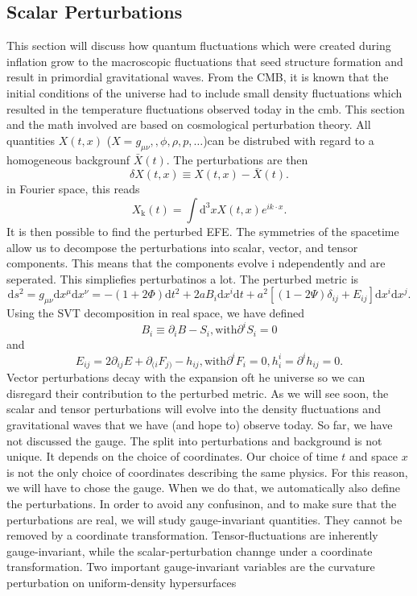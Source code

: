 \documentclass[12pt]{article}
\begin{document}
\subsection{Scalar Perturbations}
This section will discuss how quantum fluctuations which were created during inflation grow to the macroscopic fluctuations that seed structure formation and result in primordial gravitational waves. From the CMB, it is known that the initial conditions of the universe had to include small density fluctuations which resulted in the temperature fluctuations observed today in the cmb. This section and the math involved are based on cosmological perturbation theory. All quantities $X(t,x)$ ($X = g_{\mu\nu},, \phi, \rho, p, \dots$)can be distrubed with regard to a homogeneous backgrounf $\bar{X}(t)$. The perturbations are then
\begin{equation}
    \delta X(t,x) \equiv X(t,x) - \bar{X}(t).
\end{equation}
in Fourier space, this reads
\begin{equation}
    X_{\mathrm{k}}(t) = \int \mathrm{d}^3x X(t,x) e^{i k \cdot x}.
\end{equation}
It is then possible to find the perturbed EFE. The symmetries of the spacetime allow us to decompose the perturbations into scalar, vector, and tensor components. This means that the components evolve i ndependently and are seperated. This simpliefies perturbatinos a lot. The perturbed metric is 
\begin{equation}
    \mathrm{d}s^2 = g_{\mu\nu} \mathrm{d}x^\mu \mathrm{d}x^\nu = -(1+2 \Phi)\mathrm{d}t^2 + 2a B_i \mathrm{d}x^i \mathrm{d}t + a^2 \left[(1-2\Psi)\delta_{ij} + E_{ij}\right] \mathrm{d}x^i\mathrm{d}x^j.
\end{equation}
Using the SVT decomposition in real space, we have defined
\begin{equation}
    B_i \equiv \partial_i B- S_i, \mathrm{ with } \partial^i S_i = 0
\end{equation}
and
\begin{equation}
E_{ij} = 2 \partial_{ij}E + \partial_{(i}F_{j)} - h_{ij}, \mathrm{ with } \partial^iF_i = 0, h^i_i = \partial^ih_{ij} = 0.    
\end{equation}
Vector perturbations decay with the expansion oft 
he universe so we can disregard their contribution to the perturbed metric. As we will see soon, the scalar and tensor perturbations will evolve into the density fluctuations and gravitational waves that we have (and hope to) observe today. So far, we have not discussed the gauge. The split into perturbations and background is not unique. It depends on the choice of coordinates. Our choice of time $t$ and space $x$ is not the only choice of coordinates describing the same physics. For this reason, we will have to chose the gauge. When we do that, we automatically also define the perturbations. In order to avoid any confusinon, and to make sure that the perturbations are real, we will study gauge-invariant quantities. They cannot be removed by a coordinate transformation. Tensor-fluctuations are inherently gauge-invariant, while the scalar-perturbation channge under a coordinate transformation. Two important gauge-invariant variables are the curvature perturbation on uniform-density hypersurfaces
\end{document}

